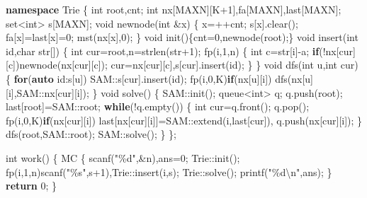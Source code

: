 \documentclass[
]{article}
\newenvironment{Shaded}{}{}
\newcommand{\CharTok}[1]{\textcolor[rgb]{0.25,0.44,0.63}{#1}}
\newcommand{\ControlFlowTok}[1]{\textcolor[rgb]{0.00,0.44,0.13}{\textbf{#1}}}
\newcommand{\DataTypeTok}[1]{\textcolor[rgb]{0.56,0.13,0.00}{#1}}
\newcommand{\DecValTok}[1]{\textcolor[rgb]{0.25,0.63,0.44}{#1}}
\newcommand{\KeywordTok}[1]{\textcolor[rgb]{0.00,0.44,0.13}{\textbf{#1}}}
\newcommand{\NormalTok}[1]{#1}
\newcommand{\SpecialCharTok}[1]{\textcolor[rgb]{0.25,0.44,0.63}{#1}}
\newcommand{\StringTok}[1]{\textcolor[rgb]{0.25,0.44,0.63}{#1}}
\begin{document}
\begin{Shaded}
\begin{Highlighting}[]
\KeywordTok{namespace}\NormalTok{ Trie}
\NormalTok{\{}
    \DataTypeTok{int}\NormalTok{ root,cnt;}
    \DataTypeTok{int}\NormalTok{ nx[MAXN][K+}\DecValTok{1}\NormalTok{],fa[MAXN],last[MAXN];}
\NormalTok{    set\textless{}}\DataTypeTok{int}\NormalTok{\textgreater{} s[MAXN];}
    \DataTypeTok{void}\NormalTok{ newnode(}\DataTypeTok{int}\NormalTok{ \&x)}
\NormalTok{    \{}
\NormalTok{        x=++cnt;}
\NormalTok{        s[x].clear();}
\NormalTok{        fa[x]=last[x]=}\DecValTok{0}\NormalTok{;}
\NormalTok{        mst(nx[x],}\DecValTok{0}\NormalTok{);    }
\NormalTok{    \}}
    \DataTypeTok{void}\NormalTok{ init()\{cnt=}\DecValTok{0}\NormalTok{,newnode(root);\}}
    \DataTypeTok{void}\NormalTok{ insert(}\DataTypeTok{int}\NormalTok{ id,}\DataTypeTok{char}\NormalTok{ str[])}
\NormalTok{    \{}
        \DataTypeTok{int}\NormalTok{ cur=root,n=strlen(str+}\DecValTok{1}\NormalTok{);}
\NormalTok{        fp(i,}\DecValTok{1}\NormalTok{,n)}
\NormalTok{        \{   }
            \DataTypeTok{int}\NormalTok{ c=str[i]{-}}\CharTok{\textquotesingle{}a\textquotesingle{}}\NormalTok{;}
            \ControlFlowTok{if}\NormalTok{(!nx[cur][c])newnode(nx[cur][c]);}
\NormalTok{            cur=nx[cur][c],s[cur].insert(id);}
\NormalTok{        \}}
\NormalTok{    \}}
    \DataTypeTok{void}\NormalTok{ dfs(}\DataTypeTok{int}\NormalTok{ u,}\DataTypeTok{int}\NormalTok{ cur)}
\NormalTok{    \{}
        \ControlFlowTok{for}\NormalTok{(}\KeywordTok{auto}\NormalTok{ id:s[u])}
\NormalTok{            SAM::s[cur].insert(id);}
\NormalTok{        fp(i,}\DecValTok{0}\NormalTok{,K)}\ControlFlowTok{if}\NormalTok{(nx[u][i])}
\NormalTok{            dfs(nx[u][i],SAM::nx[cur][i]);}
\NormalTok{    \}}
    \DataTypeTok{void}\NormalTok{ solve()}
\NormalTok{    \{}
\NormalTok{        SAM::init();}
\NormalTok{        queue\textless{}}\DataTypeTok{int}\NormalTok{\textgreater{} q;}
\NormalTok{        q.push(root);}
\NormalTok{        last[root]=SAM::root;}
        \ControlFlowTok{while}\NormalTok{(!q.empty())}
\NormalTok{        \{}
            \DataTypeTok{int}\NormalTok{ cur=q.front(); q.pop();}
\NormalTok{            fp(i,}\DecValTok{0}\NormalTok{,K)}\ControlFlowTok{if}\NormalTok{(nx[cur][i])}
\NormalTok{                last[nx[cur][i]]=SAM::extend(i,last[cur]),}
\NormalTok{                    q.push(nx[cur][i]);}
\NormalTok{        \}}
\NormalTok{        dfs(root,SAM::root);}
\NormalTok{        SAM::solve();}
\NormalTok{    \}}
\NormalTok{\};}

\DataTypeTok{int}\NormalTok{ work()}
\NormalTok{\{}
\NormalTok{    MC}
\NormalTok{    \{}
\NormalTok{        scanf(}\StringTok{"}\SpecialCharTok{\%d}\StringTok{"}\NormalTok{,\&n),ans=}\DecValTok{0}\NormalTok{;}
\NormalTok{        Trie::init();}
\NormalTok{        fp(i,}\DecValTok{1}\NormalTok{,n)scanf(}\StringTok{"}\SpecialCharTok{\%s}\StringTok{"}\NormalTok{,s+}\DecValTok{1}\NormalTok{),Trie::insert(i,s);}
\NormalTok{        Trie::solve();}
\NormalTok{        printf(}\StringTok{"}\SpecialCharTok{\%d\textbackslash{}n}\StringTok{"}\NormalTok{,ans);}
\NormalTok{    \}}
    \ControlFlowTok{return} \DecValTok{0}\NormalTok{;}
\NormalTok{\}}
\end{Highlighting}
\end{Shaded}
\end{document}
